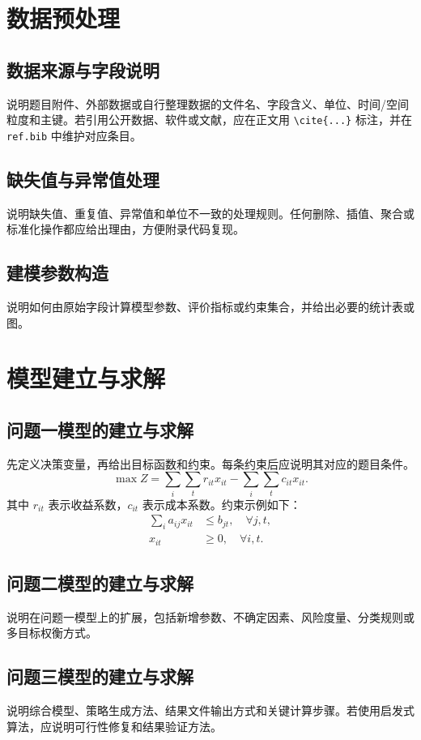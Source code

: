 \documentclass[withoutpreface,bwprint]{cumcmthesis}
\begin{document}
\section{数据预处理}
\subsection{数据来源与字段说明}
说明题目附件、外部数据或自行整理数据的文件名、字段含义、单位、时间/空间粒度和主键。若引用公开数据、软件或文献，应在正文用 \verb|\cite{...}| 标注，并在 \texttt{ref.bib} 中维护对应条目。

\subsection{缺失值与异常值处理}
说明缺失值、重复值、异常值和单位不一致的处理规则。任何删除、插值、聚合或标准化操作都应给出理由，方便附录代码复现。

\subsection{建模参数构造}
说明如何由原始字段计算模型参数、评价指标或约束集合，并给出必要的统计表或图。

\section{模型建立与求解}
\subsection{问题一模型的建立与求解}
先定义决策变量，再给出目标函数和约束。每条约束后应说明其对应的题目条件。
\begin{equation}
  \max Z = \sum_{i}\sum_t r_{it}x_{it} - \sum_i\sum_t c_{it}x_{it}.
\end{equation}
其中 $r_{it}$ 表示收益系数，$c_{it}$ 表示成本系数。约束示例如下：
\begin{align}
  \sum_i a_{ij}x_{it} &\le b_{jt}, \quad \forall j,t,\\
  x_{it} &\ge 0, \quad \forall i,t.
\end{align}

\subsection{问题二模型的建立与求解}
说明在问题一模型上的扩展，包括新增参数、不确定因素、风险度量、分类规则或多目标权衡方式。

\subsection{问题三模型的建立与求解}
说明综合模型、策略生成方法、结果文件输出方式和关键计算步骤。若使用启发式算法，应说明可行性修复和结果验证方法。
\end{document}
